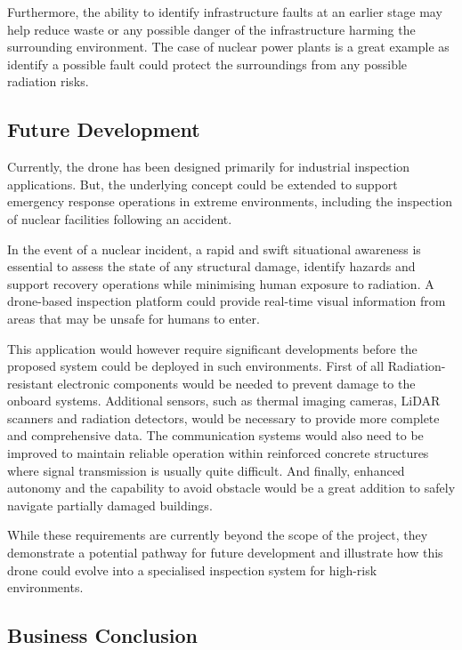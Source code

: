 \documentclass[conference]{IEEEtran}
\begin{document}
Furthermore, the ability to identify infrastructure faults at an earlier stage may help reduce waste or any possible danger of the infrastructure harming the surrounding environment. The case of nuclear power plants is a great example as identify a possible fault could protect the surroundings from any possible radiation risks.

\subsection*{Future Development}

Currently, the drone has been designed primarily for industrial inspection applications. But, the underlying concept could be extended to support emergency response operations in extreme environments, including the inspection of nuclear facilities following an accident.

In the event of a nuclear incident, a rapid and swift situational awareness is essential to assess the state of any structural damage, identify hazards and support recovery operations while minimising human exposure to radiation. A drone-based inspection platform could provide real-time visual information from areas that may be unsafe for humans to enter.

This application would however require significant developments before the proposed system could be deployed in such environments. First of all Radiation-resistant electronic components would be needed to prevent damage to the onboard systems. Additional sensors, such as thermal imaging cameras, LiDAR scanners and radiation detectors, would be necessary to provide more complete and comprehensive data. The communication systems would also need to be improved to maintain reliable operation within reinforced concrete structures where signal transmission is usually quite difficult. And finally, enhanced autonomy and the capability to avoid obstacle would be a great addition to safely navigate partially damaged buildings.

While these requirements are currently beyond the scope of the project, they demonstrate a potential pathway for future development and illustrate how this drone could evolve into a specialised inspection system for high-risk environments.

\subsection*{Business Conclusion}
\end{document}
